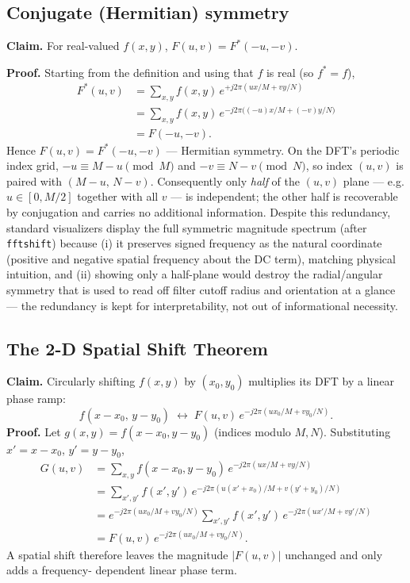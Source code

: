 \documentclass[11pt]{article}
\begin{document}
\subsection{Conjugate (Hermitian) symmetry}

\textbf{Claim.} For real-valued $f(x,y)$, $F(u,v) = F^{*}(-u,-v)$.

\textbf{Proof.} Starting from the definition and using that $f$ is real (so $f^{*}=f$),
\begin{align}
  F^{*}(u,v) &= \sum_{x,y} f(x,y)\, e^{+j2\pi(ux/M+vy/N)} \\
             &= \sum_{x,y} f(x,y)\, e^{-j2\pi\big((-u)x/M + (-v)y/N\big)} \\
             &= F(-u,-v).
\end{align}
Hence $F(u,v) = F^{*}(-u,-v)$ — Hermitian symmetry. On the DFT's periodic index grid,
$-u \equiv M-u \pmod M$ and $-v \equiv N-v \pmod N$, so index $(u,v)$ is paired with
$(M-u,\,N-v)$. Consequently only \emph{half} of the $(u,v)$ plane — e.g. $u\in[0,M/2]$ together
with all $v$ — is independent; the other half is recoverable by conjugation and carries no
additional information. Despite this redundancy, standard visualizers display the full symmetric
magnitude spectrum (after \texttt{fftshift}) because (i) it preserves signed frequency as the
natural coordinate (positive and negative spatial frequency about the DC term), matching physical
intuition, and (ii) showing only a half-plane would destroy the radial/angular symmetry that is
used to read off filter cutoff radius and orientation at a glance — the redundancy is kept for
interpretability, not out of informational necessity.

\subsection{The 2-D Spatial Shift Theorem}

\textbf{Claim.} Circularly shifting $f(x,y)$ by $(x_0,y_0)$ multiplies its DFT by a linear phase
ramp:
\begin{equation}
  f(x-x_0,\,y-y_0) \;\longleftrightarrow\; F(u,v)\, e^{-j2\pi(ux_0/M + vy_0/N)}.
\end{equation}
\textbf{Proof.} Let $g(x,y) = f(x-x_0, y-y_0)$ (indices modulo $M,N$). Substituting
$x' = x-x_0$, $y'=y-y_0$,
\begin{align}
  G(u,v) &= \sum_{x,y} f(x-x_0,y-y_0)\, e^{-j2\pi(ux/M+vy/N)} \\
         &= \sum_{x',y'} f(x',y')\, e^{-j2\pi\left(u(x'+x_0)/M + v(y'+y_0)/N\right)} \\
         &= e^{-j2\pi(ux_0/M+vy_0/N)} \sum_{x',y'} f(x',y')\, e^{-j2\pi(ux'/M+vy'/N)} \\
         &= F(u,v)\, e^{-j2\pi(ux_0/M+vy_0/N)}.
\end{align}
A spatial shift therefore leaves the magnitude $|F(u,v)|$ unchanged and only adds a frequency-
dependent linear phase term.
\end{document}
